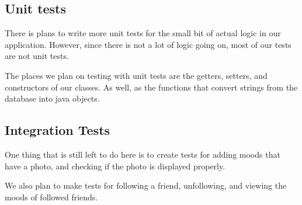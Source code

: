 \subsection{Unit tests}

There is plans to write more unit tests for the small bit of actual logic in
our application. However, since there is not a lot of logic going on, most of
our tests are not unit tests.

The places we plan on testing with unit tests are the getters, setters, and
constructors of our classes. As well, as the functions that convert strings
from the database into java objects.

\subsection{Integration Tests}

One thing that is still left to do here is to create tests for adding moods
that have a photo, and checking if the photo is displayed properly.

We also plan to make tests for following a friend, unfollowing, and viewing the
moods of followed friends.




